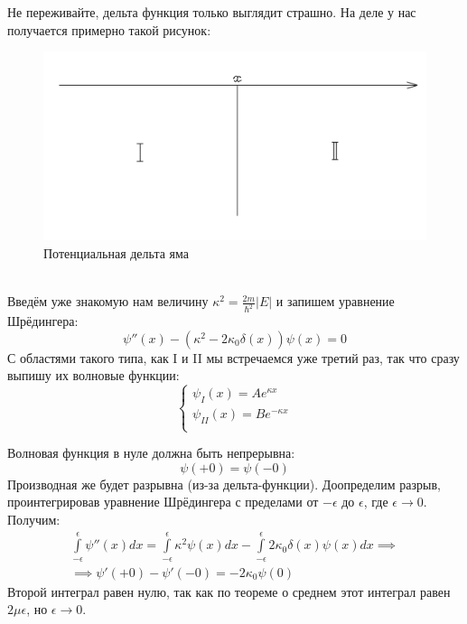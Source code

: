 Не переживайте, дельта функция только выглядит страшно. На деле у нас получается примерно такой рисунок:
\begin{figure}[!ht]
\centering
\includegraphics[scale=0.26]{class_4/images/delta hole.png}
\caption{Потенциальная дельта яма}
\label{fig 4.2}
\end{figure}\\
Введём уже знакомую нам величину $\kappa^2 = \frac{2m}{\hbar^2}|E|$ и запишем уравнение Шрёдингера:
\[
\psi''(x) - (\kappa^2 - 2\kappa_0\delta(x))\psi(x) = 0
\]
С областями такого типа, как I и II мы встречаемся уже третий раз, так что сразу выпишу их волновые функции:
\[
\begin{cases}
    \psi_I(x) = Ae^{\kappa x}\\
    \psi_{II}(x) = Be^{-\kappa x}\\
\end{cases}
\]

Волновая функция в нуле должна быть непрерывна: 
\begin{equation*}
\psi(+0) = \psi(-0)    
\end{equation*}
Производная же будет разрывна (из-за дельта-функции). Доопределим разрыв, проинтегрировав уравнение Шрёдингера с пределами от $-\epsilon$ до $\epsilon$, где $\epsilon \rightarrow 0$. Получим:
\begin{gather*}
\int\limits_{-\epsilon}^{\epsilon} \psi''(x)dx = \int\limits_{-\epsilon}^{\epsilon} \kappa^2 \psi(x) dx - \int\limits_{-\epsilon}^{\epsilon} 2 \kappa_0 \delta(x) \psi(x) dx \implies\\
\implies \psi'(+0) - \psi'(-0) = -2\kappa_0\psi(0)    
\end{gather*}
Второй интеграл равен нулю, так как по теореме о среднем этот интеграл равен $2\mu\epsilon$, но $\epsilon \rightarrow 0$.


